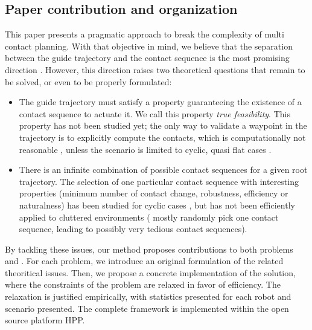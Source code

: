 \subsection{Paper contribution and organization}
This paper presents a pragmatic approach to break the complexity of multi contact planning. With that objective in mind,
we believe that the separation between the guide trajectory and the contact sequence is the most promising direction \citep{DBLP:conf/iser/EscandeKMG08}.
However, this direction raises two theoretical questions that remain to be solved, or even to be properly formulated:
\begin{itemize}
\item The guide trajectory must satisfy a property guaranteeing the existence of a contact sequence to actuate it. We call this property \textit{true feasibility}. This property has not been studied yet; the only way to validate a waypoint in the trajectory is to explicitly compute the contacts, which is computationally not reasonable \citep{Bouyarmane2009}, unless the scenario is limited to cyclic, quasi flat cases \citep{zucker2010optimization}.
\item There is an infinite combination of possible contact sequences for a given root trajectory. The selection of one particular contact sequence with interesting properties (minimum number of contact change, robustness, efficiency or naturalness) has been studied for cyclic cases \citep{Hauser06usingmotion}, but has not been efficiently applied to cluttered environments (\citeauthor{bouyarmane:lirmm-00777727, DBLP:conf/iser/EscandeKMG08} mostly randomly pick one contact sequence, leading to possibly very tedious contact sequences).
\end{itemize}

By tackling these issues, our method proposes contributions to both problems \Pa and \Pb.
For each problem, we introduce an original formulation of the related theoritical issues.
Then, we propose a concrete implementation of the solution, where the constraints of the problem are relaxed in favor of efficiency.
The relaxation is justified empirically, with statistics presented for each robot and scenario presented. The complete framework is implemented within
the open source platform HPP.

